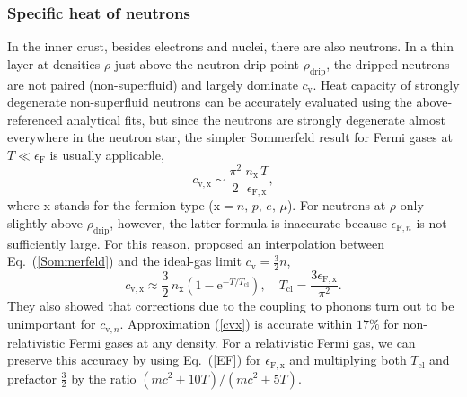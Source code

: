 \documentclass[smallextended]{svjour3}       %
\newcommand{\beq}{\begin{equation}}
\newcommand{\eeq}{\end{equation}}
\newcommand{\EF}{\epsilon_\mathrm{F}}
\newcommand{\EFn}{\epsilon_{\mathrm{F},n}}
\newcommand{\EFx}{\epsilon_\mathrm{F,x}}
\newcommand{\req}[1]{Eq.~(\ref{#1})}
\newcommand{\rhod}{\rho_\mathrm{drip}}
\begin{document}
\subsubsection{Specific heat of neutrons}
\label{sect:CVn}

In the inner crust, besides electrons and nuclei, there are
also neutrons. In a thin layer at densities $\rho$ just
above the neutron drip point $\rhod$, the dripped neutrons
are not paired (non-superfluid) and largely dominate
$c_\mathrm{v}$. Heat capacity of strongly degenerate
non-superfluid neutrons can be accurately evaluated using the
above-referenced analytical fits, but since the neutrons are
strongly degenerate almost everywhere in the neutron star,
the simpler Sommerfeld result for Fermi gases at $T\ll\EF$
is usually applicable,  \beq c_\mathrm{v,x}
\sim\frac{\pi^2}{2}\,\frac{n_\mathrm{x}\,T}{\EFx},
\label{Sommerfeld} \eeq where x stands for the fermion type
($\textrm{x}=n,\,p,\,e,\,\mu$).  For neutrons at $\rho$ only
slightly above $\rhod$, however, the latter formula is
inaccurate because $\EFn$ is not sufficiently large. For
this reason, \citet{PastoreCM15} proposed an interpolation
between  \req{Sommerfeld} and the ideal-gas limit
$c_\mathrm{v} = \frac32n$, \beq c_\mathrm{v,x} \approx
\frac32\,n_\mathrm{x} \left(1 -
\mathrm{e}^{-T/T_\mathrm{cl}} \right), \quad T_\mathrm{cl} =
\frac{3\EFx}{\pi^2}. \label{cvx} \eeq They also showed that
corrections due to the coupling to phonons \citep[e.g.,
Sect.~1.4.4 in][]{BaymPethick} turn out to be unimportant
for $c_{\mathrm{v},n}$. Approximation (\ref{cvx}) is
accurate within $17\%$ for non-relativistic Fermi gases at
any density. For a relativistic Fermi gas, we can preserve
this accuracy by using \req{EF} for $\EFx$ and multiplying
both $T_\mathrm{cl}$ and prefactor $\frac32$ by the ratio
$(mc^2+10T)/(mc^2+5T)$.
\end{document}
